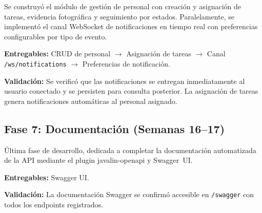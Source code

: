 Se construyó el módulo de gestión de personal con creación y asignación de tareas, evidencia fotográfica y seguimiento por estados. Paralelamente, se implementó el canal WebSocket de notificaciones en tiempo real con preferencias configurables por tipo de evento.

\textbf{Entregables:} CRUD de personal $\rightarrow$ Asignación de tareas $\rightarrow$ Canal \texttt{/ws/notifications} $\rightarrow$ Preferencias de notificación.

\textbf{Validación:} Se verificó que las notificaciones se entregan inmediatamente al usuario conectado y se persisten para consulta posterior. La asignación de tareas genera notificaciones automáticas al personal asignado.

\subsection{Fase 7: Documentación (Semanas 16--17)}

Última fase de desarrollo, dedicada a completar la documentación automatizada de la API mediante el plugin javalin-openapi y Swagger~UI.

\textbf{Entregables:} Swagger UI.

\textbf{Validación:} La documentación Swagger se confirmó accesible en \texttt{/swagger} con todos los endpoints registrados.